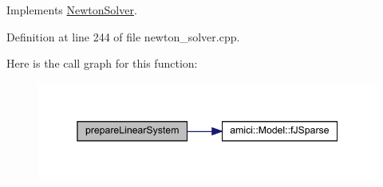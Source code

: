 Implements \mbox{\hyperlink{classamici_1_1_newton_solver_a4aed46b0343374f171f9b4b51fa009e7}{Newton\+Solver}}.



Definition at line 244 of file newton\+\_\+solver.\+cpp.

Here is the call graph for this function\+:
\nopagebreak
\begin{figure}[H]
\begin{center}
\leavevmode
\includegraphics[width=345pt]{classamici_1_1_newton_solver_sparse_a0b900656d018299b08d0f027e95bd347_cgraph}
\end{center}
\end{figure}
